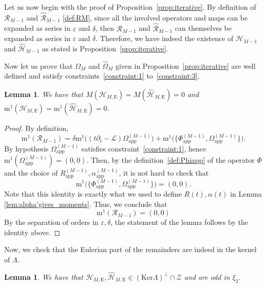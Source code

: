 \documentclass[11pt,reqno,a4paper]{amsart}
\def\eps{\varepsilon}
\newcommand{\cH}{\mathcal{H}}
\newcommand{\cL}{\mathcal{L}}
\newcommand{\cR}{\mathcal{R}}
\newcommand{\cZ}{\mathcal{Z}}
\newcommand{\mrm}{\mathrm{m}}
\newcommand{\1}{\mathbbm{1}}
\newtheorem{lemma}[proposition]{Lemma}
\theoremstyle{definition}
\theoremstyle{definition}
\numberwithin{equation}{section}
\newcommand{\Mapp}[2]{#1^{(#2)}_\mathrm{app}}
\begin{document}
Let us now begin with the proof of Proposition~\ref{prop:iterative}. By definition of $\cR_{M-1}$ and $\widehat{\cR}_{M-1}$ \cref{def:RM}, since all the involved operators and maps can be expanded as series in $\eps$ and $\delta$, then $\cR_{M-1}$ and $\widehat{\cR}_{M-1}$ can themselves be expanded as series in $\eps$ and $\delta$. Therefore, we have indeed the existence of $\cH_{M-1}$ and $\widehat{\cH}_{M-1}$ as stated is Proposition~\ref{prop:iterative}.



Now let us prove that $\Omega_{M}$ and $\widehat{\Omega}_{M}$ given in Proposition~\ref{prop:iterative} are well defined and satisfy constraints~\ref{constraint:1} to~\ref{constraint:3}.

    \begin{lemma}\label{lem:mrmOfHm}
        We have that $M(\cH_{M,\mathrm{E}}) = M(\widehat{\cH}_{M,\mathrm{E}}) = 0$ and $\mrm^1(\cH_{M,\mathrm{E}}) =  \mrm^1(\widehat{\cH}_{M,\mathrm{E}}) =0$.
    \end{lemma}
    \begin{proof}
        By definition,
        \begin{equation}
            \mrm^1(\cR_{M-1}) = \delta \mrm^1\big((t\partial_t - \cL) \Mapp{\Omega}{M-1} \big)+ \mrm^1 \big( \{ \Mapp{\Phi}{M-1},\Mapp{\Omega}{M-1} \} \big).
        \end{equation}
       By hypothesis $\Mapp{\Omega}{M-1}$ satisfies constraint~\ref{constraint:1}, hence $\mrm^1(\Mapp{\Omega}{M-1} )= (0,0)$. Then, by the definition~\cref{def:Phiapp} of the operator $\Phi$ and the choice of $\Mapp{R}{M-1}, \Mapp{\alpha}{M-1}$, it is not hard to check that
        \begin{equation}
             \mrm^1 \big( \{ \Mapp{\Phi}{M-1},\Mapp{\Omega}{M-1} \} \big)=(0,0).
        \end{equation}
        Note that this identity is exactly what we used to define $R(t),\alpha(t)$ in Lemma \ref{lem:alpha'gives_moments}. Thus, we conclude that
        \begin{equation}
            \mrm^1(\cR_{M-1}) = (0,0)
        \end{equation}
By the separation of orders in $\eps,\delta$, the statement of the lemma follows by the identity above.   \end{proof}
Now, we check that the Eulerian part of the remainders are indeed in the kernel of $\Lambda.$
    \begin{lemma}
    \label{lem:Hmodd}
        We have that $\cH_{M,\mathrm{E}},\widehat{\cH}_{M,\mathrm{E}} \in (\mathrm{Ker} \Lambda)^\perp \cap \cZ$ and are odd in $\xi_2$.
    \end{lemma}
\end{document}
